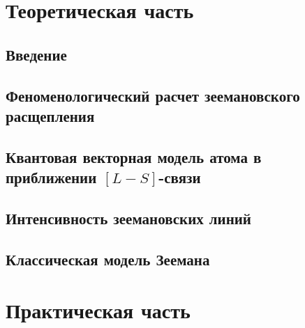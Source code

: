 



\def\labauthors{}
\def\labgroup{430}
\def\labnumber{2}
\def\labtheme{Эффект Зеемана}
\renewcommand{\vec}{\mathbf}

\renewcommand{\phi}{\varphi}
\renewcommand{\hat}{\widehat}



\tableofcontents
\newpage
\section{Теоретическая часть}
\subsection{Введение}

\subsection{Феноменологический расчет зеемановского расщепления}

\subsection{Квантовая векторная модель атома в приближении $[L-S]$-связи}

\subsection{Интенсивность зеемановских линий}

\subsection{Классическая модель Зеемана}

\section{Практическая часть}



